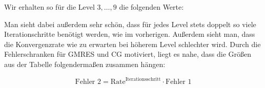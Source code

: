 \documentclass[12pt,a4paper]{scrartcl}
\numberwithin{equation}{section}
\begin{document}
\begin{figure}[H]
	\centering
\end{figure}

Wir erhalten so für die Level $3, \dots,9$ die folgenden Werte:

\begin{figure}[H]
	\centering
\end{figure}

Man sieht dabei außerdem sehr schön, dass für jedes Level stets doppelt so viele Iterationschritte benötigt werden, wie im vorherigen. Außerdem sieht man, dass die Konvergenzrate wie zu erwarten bei höherem Level schlechter wird. 
Durch die Fehlerschranken für GMRES und CG motiviert, liegt es nahe, dass die Größen aus der Tabelle folgendermaßen zusammen hängen:

\[\text{Fehler 2}= \text{Rate}^{\text{Iterationsschritt}} \cdot \text{Fehler 1}\]
\end{document}
